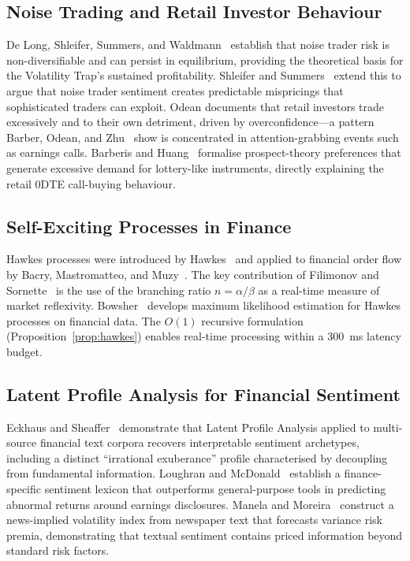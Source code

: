 \documentclass[10pt,twocolumn]{article}
\begin{document}
\subsection{Noise Trading and Retail Investor Behaviour}

De Long, Shleifer, Summers, and Waldmann~\cite{delong1990} establish that noise
trader risk is non-diversifiable and can persist in equilibrium, providing the
theoretical basis for the Volatility Trap's sustained profitability. Shleifer
and Summers~\cite{shleifer1990} extend this to argue that noise trader sentiment
creates predictable mispricings that sophisticated traders can exploit. Odean
\cite{odean1998} documents that retail investors trade excessively and to their
own detriment, driven by overconfidence---a pattern Barber, Odean, and
Zhu~\cite{barber2009} show is concentrated in attention-grabbing events such as
earnings calls. Barberis and Huang~\cite{barberis2008} formalise
prospect-theory preferences that generate excessive demand for lottery-like
instruments, directly explaining the retail 0DTE call-buying behaviour.

\subsection{Self-Exciting Processes in Finance}

Hawkes processes were introduced by Hawkes~\cite{hawkes1971} and applied to
financial order flow by Bacry, Mastromatteo, and Muzy~\cite{bacry2015}. The
key contribution of Filimonov and Sornette~\cite{filimonov2012} is the use of
the branching ratio $n=\alpha/\beta$ as a real-time measure of market
reflexivity. Bowsher~\cite{bowsher2007} develops maximum likelihood estimation
for Hawkes processes on financial data. The $O(1)$ recursive formulation
(Proposition~\ref{prop:hawkes}) enables real-time processing within a 300~ms
latency budget.

\subsection{Latent Profile Analysis for Financial Sentiment}

Eckhaus and Sheaffer~\cite{eckhaus2026} demonstrate that Latent Profile
Analysis applied to multi-source financial text corpora recovers interpretable
sentiment archetypes, including a distinct ``irrational exuberance'' profile
characterised by decoupling from fundamental information. Loughran and
McDonald~\cite{loughran2011} establish a finance-specific sentiment lexicon
that outperforms general-purpose tools in predicting abnormal returns around
earnings disclosures. Manela and Moreira~\cite{manela2017} construct a
news-implied volatility index from newspaper text that forecasts variance risk
premia, demonstrating that textual sentiment contains priced information beyond
standard risk factors.
\end{document}

